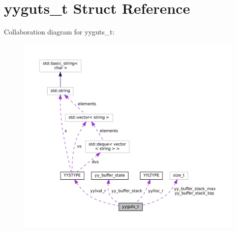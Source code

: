 \hypertarget{structyyguts__t}{}\section{yyguts\+\_\+t Struct Reference}
\label{structyyguts__t}


Collaboration diagram for yyguts\+\_\+t\+:\nopagebreak
\begin{figure}[H]
\begin{center}
\leavevmode
\includegraphics[width=350pt]{structyyguts__t__coll__graph}
\end{center}
\end{figure}
